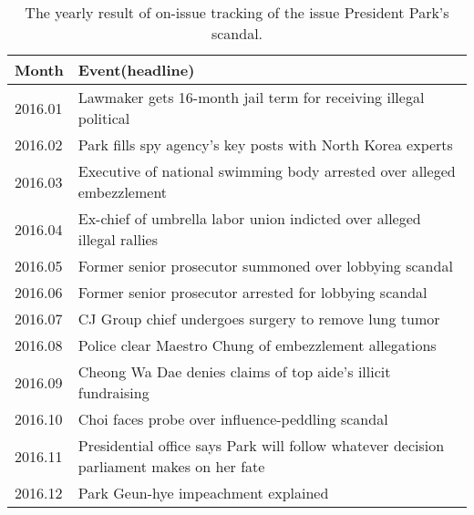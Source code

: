 \begin{table}[!htbp]
  \begin{tabular}{l|l}
  Month   & Event(headline)                                        \\ \hline
  2016.01 & Lawmaker gets 16-month jail term for receiving illegal political \\
  2016.02 & Park fills spy agency’s key posts with North Korea experts \\
  2016.03 & Executive of national swimming body arrested over alleged embezzlement \\
  2016.04 & Ex-chief of umbrella labor union indicted over alleged illegal rallies \\
  2016.05 & Former senior prosecutor summoned over lobbying scandal \\
  2016.06 & Former senior prosecutor arrested for lobbying scandal  \\
  2016.07 & CJ Group chief undergoes surgery to remove lung tumor   \\
  2016.08 & Police clear Maestro Chung of embezzlement allegations  \\
  2016.09 & Cheong Wa Dae denies claims of top aide's illicit fundraising \\
  2016.10 & Choi faces probe over influence-peddling scandal        \\
  2016.11 & Presidential office says Park will follow whatever decision parliament makes on her fate \\
  2016.12 & Park Geun-hye impeachment explained                     \\      
  \end{tabular}
  \caption{The yearly result of on-issue tracking of the issue President Park's scandal.}
\end{table}